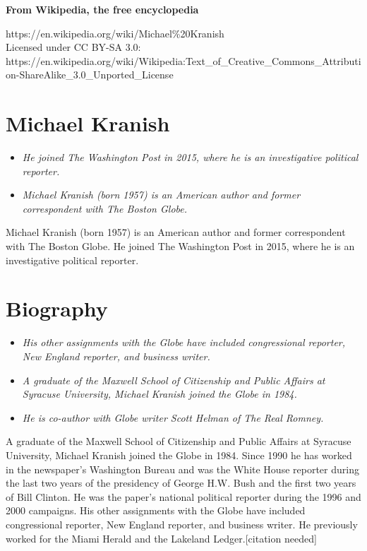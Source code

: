 \textbf{From Wikipedia, the free encyclopedia}

https://en.wikipedia.org/wiki/Michael\%20Kranish\\
Licensed under CC BY-SA 3.0:\\
https://en.wikipedia.org/wiki/Wikipedia:Text\_of\_Creative\_Commons\_Attribution-ShareAlike\_3.0\_Unported\_License

\section{Michael Kranish}\label{michael-kranish}

\begin{itemize}
\item
  \emph{He joined The Washington Post in 2015, where he is an
  investigative political reporter.}
\item
  \emph{Michael Kranish (born 1957) is an American author and former
  correspondent with The Boston Globe.}
\end{itemize}

Michael Kranish (born 1957) is an American author and former
correspondent with The Boston Globe. He joined The Washington Post in
2015, where he is an investigative political reporter.

\section{Biography}\label{biography}

\begin{itemize}
\item
  \emph{His other assignments with the Globe have included congressional
  reporter, New England reporter, and business writer.}
\item
  \emph{A graduate of the Maxwell School of Citizenship and Public
  Affairs at Syracuse University, Michael Kranish joined the Globe in
  1984.}
\item
  \emph{He is co-author with Globe writer Scott Helman of The Real
  Romney.}
\end{itemize}

A graduate of the Maxwell School of Citizenship and Public Affairs at
Syracuse University, Michael Kranish joined the Globe in 1984. Since
1990 he has worked in the newspaper's Washington Bureau and was the
White House reporter during the last two years of the presidency of
George H.W. Bush and the first two years of Bill Clinton. He was the
paper's national political reporter during the 1996 and 2000 campaigns.
His other assignments with the Globe have included congressional
reporter, New England reporter, and business writer. He previously
worked for the Miami Herald and the Lakeland Ledger.{[}citation
needed{]}

